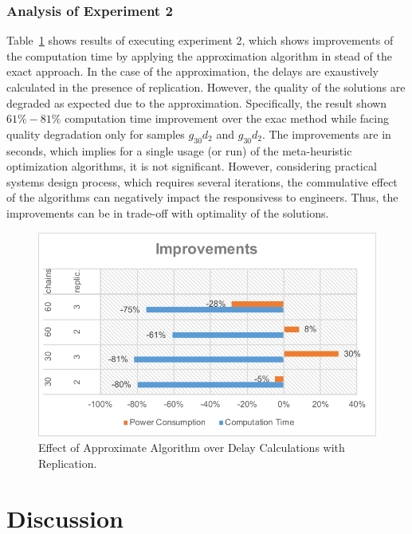 \subsubsection{Analysis of Experiment 2}
Table~\ref{fig_chainsreplicationimprovements} shows results of executing experiment 2, which shows improvements of the computation time by applying the approximation algorithm in stead of the exact approach. In the case of the approximation, the delays are exaustively calculated in the presence of replication. However, the quality of the solutions are degraded as expected due to the approximation. Specifically, the result shown $61\%-81\%$ computation time improvement over the exac method while facing quality degradation only for samples $g_{30}d_{2}$ and  $g_{30}d_{2}$. The improvements are in seconds, which implies for a single usage (or run) of the meta-heuristic optimization algorithms, it is not significant. However, considering practical systems design process, which requires several iterations, the commulative effect of the algorithms can negatively impact the responsivess to engineers. Thus, the improvements can be in trade-off with optimality of the solutions.
\begin{figure}
	\centering
	\includegraphics[width=0.7\linewidth]{img/chains_replication_improvements}
	\caption{Effect of Approximate Algorithm over Delay Calculations with Replication.}
	\label{fig_chainsreplicationimprovements}
\end{figure}

\section{Discussion}
